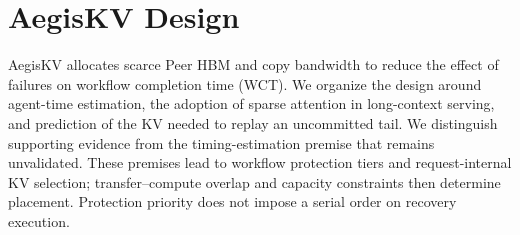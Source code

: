 \section{AegisKV Design}
\label{sec:design}

AegisKV allocates scarce Peer HBM and copy bandwidth to reduce the
effect of failures on workflow completion time (WCT).
We organize the design around agent-time estimation, the adoption of
sparse attention in long-context serving, and prediction of the KV
needed to replay an uncommitted tail. We distinguish supporting evidence
from the timing-estimation premise that remains unvalidated.
These premises lead to workflow protection tiers and request-internal
KV selection; transfer--compute overlap and capacity constraints then
determine placement. Protection priority does not impose a serial order
on recovery execution.










